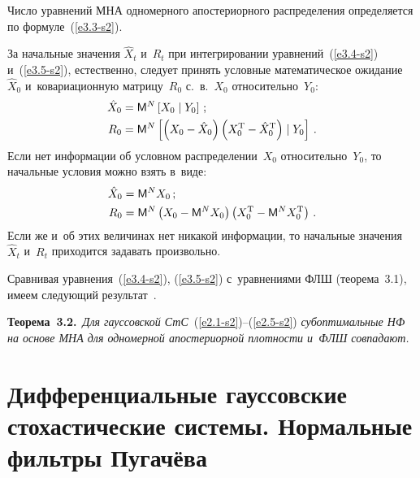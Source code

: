 \begin{multicols}{2}
Число уравнений МНА одномерного апостериорного распределения
определяется по формуле~(\ref{e3.3-s2}).


За начальные значения $\hat X_t$ и~$R_t$  при интегрировании
уравнений~(\ref{e3.4-s2}) и~(\ref{e3.5-s2}), естественно, следует принять
условные математическое ожидание $\hat X_0$ и~ковариационную матрицу~$R_0$ с.~в.~$X_0$ 
относительно~$Y_0$:
\begin{align*}
\hat X_0 &= {\sf M}^N\left[ X_0 \mid Y_0\right]\,;\\
R_0 &= {\sf M}^N \left[ \left(X_0 -\hat X_0\right) 
\left(X_0^{\mathrm{T}} -\hat X_0^{\mathrm{T}}\right)\mid
Y_0\right]\,.
\end{align*}
Если нет
информации об условном распределении~$X_0$ относительно~$Y_0$, то
начальные условия можно взять в~виде:
\begin{align*}
\hat X_0 &= \mm^N  X_0\,; \\ %
    R_0&= \mm^N  \left(X_0 - \mm^N X_0\right) 
    \left(X_0^{\mathrm{T}} - \mm^N X_0^{\mathrm{T}}\right)\,.
    \end{align*}
Если же и~об этих величинах нет никакой информации, то начальные
значения $\hat X_t$ и~$R_t$ приходится задавать произвольно.

Сравнивая  уравнения~(\ref{e3.4-s2}), (\ref{e3.5-s2}) с~уравнениями ФЛШ 
(теорема~3.1), 
имеем следующий результат~\cite{1-s2}.

\smallskip

\noindent
\textbf{Теорема~3.2.}\
\textit{Для гауссовской СтС}~(\ref{e2.1-s2})--(\ref{e2.5-s2}) 
\textit{субоптимальные НФ на основе МНА для одномерной апостериорной плотности 
и~ФЛШ совпадают.}


\section{Дифференциальные гауссовские стохастические системы. Нормальные фильтры Пугачёва}


\end{multicols}
